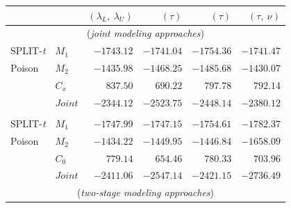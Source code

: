 \documentclass[a0paper,portrait,fontscale = 0.39,margin=2.5em]{baposter/baposter}
\begin{document}
\begin{poster}
{\begin{multicols}{2}
\begin{compactitem}
{\begin{tabular}{llrrrr}
            \multicolumn{2}{c}{}     &   $(\lambda_L,~\lambda_U)$  &  $(\tau)$  &  $(\tau)$ &
                                                                                              $(\tau,~ \nu)$   \\

            \midrule

            \multicolumn{6}{c}{(\emph{joint modeling approaches})}\\

            SPLIT-\emph{t} &  $M_1$  &    $-1743.12$      &   $-1741.04$       &   $-1754.36$      &    $-1741.47$               \\
            Poison               &  $M_2$  &     $-1435.98$    &     $-1468.25$     &    $-1485.68$     &     $-1430.07$                \\
                                                       &  $C_x$   &     $837.50$       &   $690.22$       &  $797.78$       &       $792.14$              \\
                                                       &  $Joint$   &    $\mathbf{-2344.12}$       &    $-2523.75$     &   $-2448.14$     &   $-2380.12$                \\
            \\

            SPLIT-\emph{t} &  $M_1$  &    $-1747.99$      &   $-1747.15$       &   $-1754.61$      &       $-1782.37$            \\
            Poison               &  $M_2$  &     $-1434.22$    &     $-1449.95$     &    $-1446.84$     &     $-1658.09$                \\
                                                       &  $C_0$   &     $779.14$       &   $654.46$       &  $780.33$       &      $703.96$               \\
                                                       &  $Joint$   &    $\mathbf{-2411.06}$       &    $-2547.14$     &   $-2421.15$     &   $-2736.49$                \\
            \midrule

            \multicolumn{6}{c}{(\emph{two-stage modeling approaches})}\\



\end{tabular}}
\end{compactitem}
\end{multicols}}
\end{poster}
\end{document}
